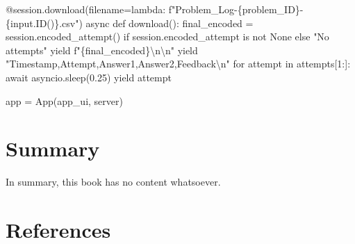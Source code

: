 \documentclass[
  letterpaper,
  DIV=11,
  numbers=noendperiod]{scrreprt}
\newenvironment{Shaded}{\begin{snugshade}}{\end{snugshade}}
\newcommand{\NormalTok}[1]{\textcolor[rgb]{0.00,0.23,0.31}{#1}}
\newlength{\cslhangindent}
\newenvironment{CSLReferences}[2] %
 {\begin{list}{}{%
  \setlength{\itemindent}{0pt}
  \setlength{\leftmargin}{0pt}
  \setlength{\parsep}{0pt}
  \ifodd #1
   \setlength{\leftmargin}{\cslhangindent}
   \setlength{\itemindent}{-1\cslhangindent}
  \fi
  \setlength{\itemsep}{#2\baselineskip}}}
 {\end{list}}
\begin{document}
\begin{Shaded}
\begin{Highlighting}[]
\NormalTok{    @session.download(filename=lambda: f"Problem\_Log{-}\{problem\_ID\}{-}\{input.ID()\}.csv")}
\NormalTok{    async def download():}
\NormalTok{        final\_encoded = session.encoded\_attempt() if session.encoded\_attempt is not None else "No attempts"}
\NormalTok{        yield f"\{final\_encoded\}\textbackslash{}n\textbackslash{}n"}
\NormalTok{        yield "Timestamp,Attempt,Answer1,Answer2,Feedback\textbackslash{}n"}
\NormalTok{        for attempt in attempts[1:]:}
\NormalTok{            await asyncio.sleep(0.25)}
\NormalTok{            yield attempt}

\NormalTok{app = App(app\_ui, server)}
\end{Highlighting}
\end{Shaded}


\chapter{Summary}\label{summary}

In summary, this book has no content whatsoever.


\chapter*{References}\label{references}


\label{refs}
\begin{CSLReferences}{0}{1}
\end{CSLReferences}
\end{document}
